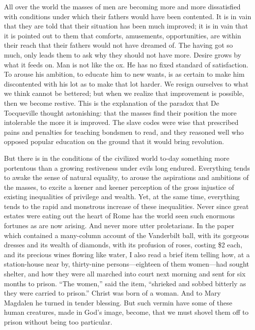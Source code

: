 \documentclass{book}
\begin{document}
All over the world the masses of men are becoming more and more dissatisfied with conditions under which their fathers would have been contented. It is in vain that they are told that their situation has been much improved; it is in vain that it is pointed out to them that comforts, amusements, opportunities, are within their reach that their fathers would not have dreamed of. The having got so much, only leads them to ask why they should not have more. Desire grows by what it feeds on. Man is not like the ox. He has no fixed standard of satisfaction. To arouse his ambition, to educate him to new wants, is as certain to make him discontented with his lot as to make that lot harder. We resign ourselves to what we think cannot be bettered; but when we realize that improvement is possible, then we become restive. This is the explanation of the paradox that De Tocqueville thought astonishing: that the masses find their position the more intolerable the more it is improved. The slave codes were wise that prescribed pains and penalties for teaching bondsmen to read, and they reasoned well who opposed popular education on the ground that it would bring revolution.

But there is in the conditions of the civilized world to-day something more portentous than a growing restiveness under evils long endured. Everything tends to awake the sense of natural equality, to arouse the aspirations and ambitions of the masses, to excite a keener and keener perception of the gross injustice of existing inequalities of privilege and wealth. Yet, at the same time, everything tends to the rapid and monstrous increase of these inequalities. Never since great estates were eating out the heart of Rome has the world seen such enormous fortunes as are now arising. And never more utter proletarians. In the paper which contained a many-column account of the Vanderbilt ball, with its gorgeous dresses and its wealth of diamonds, with its profusion of roses, costing \$2 each, and its precious wines flowing like water, I also read a brief item telling how, at a station-house near by, thirty-nine persons—eighteen of them women—had sought shelter, and how they were all marched into court next morning and sent for six months to prison. “The women,” said the item, “shrieked and sobbed bitterly as they were carried to prison.” Christ was born of a woman. And to Mary Magdalen he turned in tender blessing. But such vermin have some of these human creatures, made in God’s image, become, that we must shovel them off to prison without being too particular.
\end{document}
